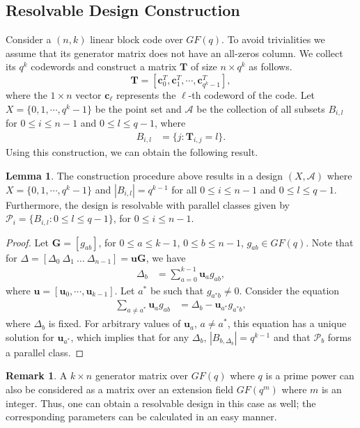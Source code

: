 \documentclass[journal,twocolumn]{IEEEtran}
\theoremstyle{definition}
\newtheorem{lemma}{Lemma}
\newtheorem{remark}{Remark}
\newcommand{\calA}{\mathcal{A}}
\newcommand{\calP}{\mathcal{P}}
\newcommand{\bfu}{\mathbf{u}}
\newcommand{\bfc}{\mathbf{c}}
\newcommand{\bfT}{\mathbf{T}}
\newcommand{\bfG}{\mathbf{G}}
\begin{document}
\subsection{Resolvable Design Construction}
\label{sec:construction}
 Consider a $(n,k)$ linear block code over $GF(q)$. To avoid trivialities we assume that its generator matrix does not have an all-zeros column. We collect its $q^k$ codewords %
 and construct a matrix $\bfT$ of size $n\times q^{k}$ as follows.
 \begin{equation}
 \label{eq:T}
 \bfT=[\bfc_0^T,\bfc_1^T,\cdots,\bfc_{q^{k}-1}^T],
 \end{equation}
where the $1 \times n$ vector $\bfc_\ell$ represents the $\ell$-th codeword of the code. Let $X=\{0,1,\cdots,q^{k}-1\}$ be the point set and $\calA$ be the collection of all subsets $B_{i,l}$ for $0\le i\le n-1$ and $0\le l\le q-1$, where
 \begin{align*}
 B_{i,l}&=\{j:\bfT_{i,j}=l\}.
 \end{align*}
Using this construction, we can obtain the following result.
\begin{lemma}
 \label{lemma:Resolve_MDS}
The construction procedure above results in a design $(X, \calA)$ where $X = \{0,1,\cdots, q^k-1\}$ and $|B_{i,l}| = q^{k-1}$ for all $0 \leq i \leq n-1$ and $0 \leq l \leq q-1$. Furthermore, the design is resolvable with parallel classes given by $\calP_i = \{B_{i,l}: 0 \leq l \leq q-1\}$, for $0\leq i \leq n-1$.
\end{lemma}
\begin{proof}
Let $\bfG=[g_{ab}]$, for $0\le a\le k-1$, $0\le b\le n-1$, $g_{ab}\in GF(q)$. Note that for $\Delta = [\Delta_0 ~\Delta_1~ \dots~\Delta_{n-1}]= \bfu \bfG$, we have
\begin{align*}
\Delta_b &= \sum_{a=0}^{k-1} \bfu_ag_{ab},
\end{align*}
where $\bfu=[\bfu_0,\cdots, \bfu_{k-1}]$. Let $a^*$ be such that $g_{a^*b} \neq 0$. Consider the equation
\begin{align*}
\sum_{a \neq a^*} \bfu_ag_{ab}&=\Delta_b-\bfu_{a^*}g_{a^*b},
\end{align*}
where $\Delta_b$ is fixed. For arbitrary values of $\bfu_a$, $a \neq a^*$, this equation has a unique solution for $\bfu_{a^*}$, which implies that for any $\Delta_b$, $|B_{b,\Delta_b   }| = q^{k-1}$ and that $\calP_{b}$ forms a parallel class.
\end{proof}
\begin{remark} A $k \times n$ generator matrix over $GF(q)$ where $q$ is a prime power can also be considered as a matrix over an extension field $GF(q^m)$ where $m$ is an integer. Thus, one can obtain a resolvable design in this case as well; the corresponding parameters can be calculated in an easy manner.
\end{remark}
\end{document}
